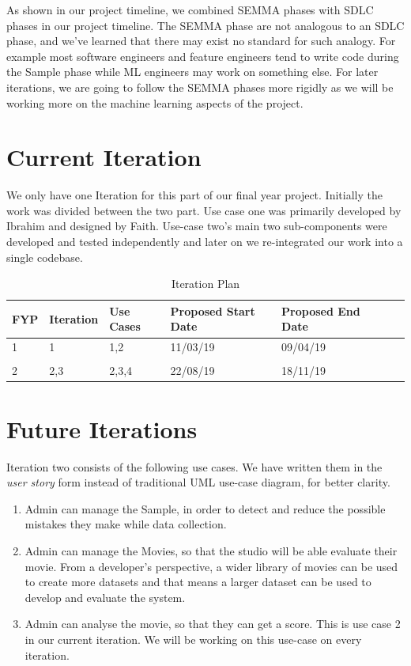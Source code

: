 \documentclass[12pt,a4paper,man]{report}
\begin{document}
As shown in our project timeline, we combined SEMMA phases with SDLC phases in our project timeline. The SEMMA phase are not analogous to an SDLC phase, and we've learned that there may exist no standard for such analogy. For example most software engineers and feature engineers tend to write code during the Sample phase while ML engineers may work on something else. For later iterations, we are going to follow the SEMMA phases more rigidly as we will be working more on the machine learning aspects of the project.


\section{Current Iteration}
\label{sec:orga08264e}
We only have one Iteration for this part of our final year project. Initially the work was divided between the two part. Use case one was primarily developed by Ibrahim and designed by Faith. Use-case two's main two sub-components were developed and tested independently and later on we re-integrated our work into a single codebase. 

\begin{table}[htbp]
\caption{\label{table:iterplan}
Iteration Plan}
\centering
\begin{tabular}{|l|l|l|l|l|lp{3cm}|}
\hline
\textbf{FYP} & \textbf{Iteration} & \textbf{Use Cases} & \textbf{Proposed Start Date} & \textbf{Proposed End Date}\\
\hline
1 & 1 & 1,2 & 11/03/19 & 09/04/19\\
 &  &  &  & \\
\hline
2 & 2,3 & 2,3,4 & 22/08/19 & 18/11/19\\
\hline
\end{tabular}
\end{table}


\section{Future Iterations}
\label{sec:orgea258cd}

Iteration two consists of the following use cases. We have written them in the \emph{user story} form 
instead of traditional UML use-case diagram, for better clarity.
\begin{enumerate}
\item Admin can manage the Sample, in order to detect and reduce the possible mistakes they make while data collection.
\item Admin can manage the Movies, so that the studio will be able evaluate their movie. From a developer's perspective, a wider library of movies can be used to create more datasets and that means a larger dataset can be used to develop and evaluate the system.
\item Admin can analyse the movie, so that they can get a score. This is use case 2 in our current iteration. We will be working on this use-case on every iteration.
\end{enumerate}
\end{document}
